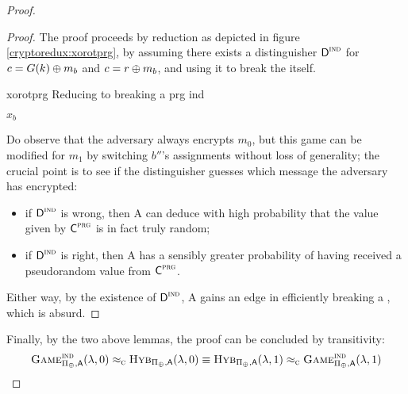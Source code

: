 \begin{proof}
    \begin{proof}
        The proof proceeds by reduction as depicted in figure \ref{cryptoredux:xorotprg}, by assuming there exists a distinguisher $\textsf{D}^{\textsc{ind}}$ for $c = G(k) \oplus m_{b}$ and $c = r \oplus m_{b}$, and using it to break the \prg{} itself.

        \begin{cryptoredux}
            {xorotprg}
            {Reducing to breaking a \prg}
            {prg}
            {ind}

            {$x_b$}{}




            \cseqdelay

        \end{cryptoredux}

        Do observe that the adversary always encrypts $m_0$, but this game can be modified for $m_1$ by switching $b''$'s assignments without loss of generality; the crucial point is to see if the distinguisher guesses which message the adversary has encrypted:
        \begin{itemize}
            \item if $\textsf{D}^\textsc{ind}$ is wrong, then \textsf{A} can deduce with high probability that the value given by $\textsf{C}^\textsc{prg}$ is in fact truly random;
            \item if $\textsf{D}^\textsc{ind}$ is right, then \textsf{A} has a sensibly greater probability of having received a pseudorandom value from $\textsf{C}^\textsc{prg}$.
        \end{itemize} 

        Either way, by the existence of $\textsf{D}^\textsc{ind}$, \textsf{A} gains an edge in efficiently breaking a \prg{}, which is absurd.
    \end{proof}

    Finally, by the two above lemmas, the proof can be concluded by transitivity:
    \[
        \textsc{Game}_{\Pi_{\oplus}, \textsf{A}}^{\textsc{ind}}(\lambda, 0) \approx_\textsc{c}
        \textsc{Hyb}_{\Pi_{\oplus}, \textsf{A}}(\lambda, 0) \equiv
        \textsc{Hyb}_{\Pi_{\oplus}, \textsf{A}}(\lambda, 1) \approx_\textsc{c}
        \textsc{Game}_{\Pi_{\oplus}, \textsf{A}}^{\textsc{ind}}(\lambda, 1)
    \]

\end{proof}
 


